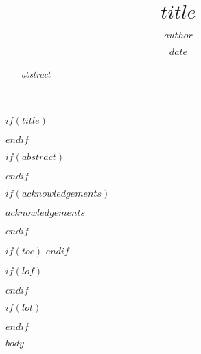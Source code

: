 \documentclass[12pt,msc,a4paper,twoside]{ucl_thesis}
\title{$title$}
\author{$author$}
\date{$date$}
\begin{document}

  $if(title)$
    \maketitle
  $endif$

\makedeclaration

  $if(abstract)$
    \begin{abstract}
      $abstract$
    \end{abstract}
  $endif$

  $if(acknowledgements)$
    \begin{acknowledgements}
      $acknowledgements$
    \end{acknowledgements}
  $endif$

  $if(toc)$
    \hypersetup{linkcolor=$if(toccolor)$$toccolor$$else$black$endif$}
   \setcounter{tocdepth}{2} 
    \tableofcontents
  $endif$

 $if(lof)$
    \listoffigures
  $endif$

  $if(lot)$
    \listoftables
  $endif$



  $body$


\end{document}
